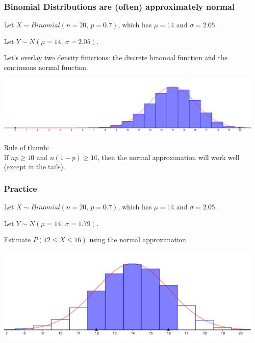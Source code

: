 \begin{frame}
\frametitle{Binomial Distributions are (often) approximately normal}
Let $X\sim Binomial(n=20,\,p=0.7)$, which has $\mu = 14$ and $\sigma = 2.05$. \pause

Let $Y\sim N(\mu=14,\, \sigma=2.05)$. \pause

Let's overlay two density functions: the discrete binomial function and the continuous normal function. \pause
\begin{center}
\includegraphics[scale=0.08]{3-4_binomial_distribution/figures/bin_norm/geogebra-export.png}
\end{center}

Rule of thumb:\\
If $np \ge 10$ and $n(1-p) \ge 10$, then the normal approximation will work well (except in the tails).
\end{frame}


\begin{frame}
\frametitle{Practice}
Let $X\sim Binomial(n=20,\,p=0.7)$, which has $\mu = 14$ and $\sigma = 2.05$. \pause

Let $Y\sim N(\mu=14,\, \sigma=1.79)$. \pause

Estimate $P(12 \le X \le 16)$ using the normal approximation.
\begin{center}
\includegraphics[scale=0.08]{3-4_binomial_distribution/figures/bin_norm/geogebra-export2.png}
\end{center}
\pause
{}
\pause
{}~~\pause~~
\pause
{}

\end{frame}







